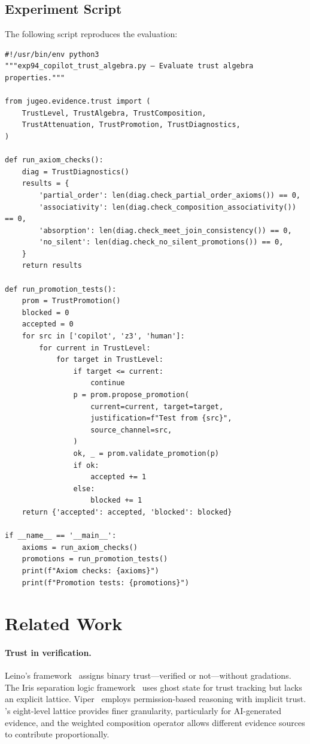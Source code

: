 \documentclass[11pt]{article}
\begin{document}
\subsection{Experiment Script}

The following script reproduces the evaluation:

\begin{lstlisting}[style=jugeo-python]
#!/usr/bin/env python3
"""exp94_copilot_trust_algebra.py — Evaluate trust algebra properties."""

from jugeo.evidence.trust import (
    TrustLevel, TrustAlgebra, TrustComposition,
    TrustAttenuation, TrustPromotion, TrustDiagnostics,
)

def run_axiom_checks():
    diag = TrustDiagnostics()
    results = {
        'partial_order': len(diag.check_partial_order_axioms()) == 0,
        'associativity': len(diag.check_composition_associativity()) == 0,
        'absorption': len(diag.check_meet_join_consistency()) == 0,
        'no_silent': len(diag.check_no_silent_promotions()) == 0,
    }
    return results

def run_promotion_tests():
    prom = TrustPromotion()
    blocked = 0
    accepted = 0
    for src in ['copilot', 'z3', 'human']:
        for current in TrustLevel:
            for target in TrustLevel:
                if target <= current:
                    continue
                p = prom.propose_promotion(
                    current=current, target=target,
                    justification=f"Test from {src}",
                    source_channel=src,
                )
                ok, _ = prom.validate_promotion(p)
                if ok:
                    accepted += 1
                else:
                    blocked += 1
    return {'accepted': accepted, 'blocked': blocked}

if __name__ == '__main__':
    axioms = run_axiom_checks()
    promotions = run_promotion_tests()
    print(f"Axiom checks: {axioms}")
    print(f"Promotion tests: {promotions}")
\end{lstlisting}

\section{Related Work}\label{sec:related}

\paragraph{Trust in verification.}
Leino's \Dafny{} framework~\cite{leino2010dafny} assigns binary
trust---verified or not---without gradations.  The Iris separation logic
framework~\cite{jung2018iris} uses ghost state for trust tracking but lacks
an explicit lattice.  Viper~\cite{muller2016viper} employs permission-based
reasoning with implicit trust.  \JuGeo's eight-level lattice provides finer
granularity, particularly for AI-generated evidence, and the weighted
composition operator allows different evidence sources to contribute
proportionally.
\end{document}
